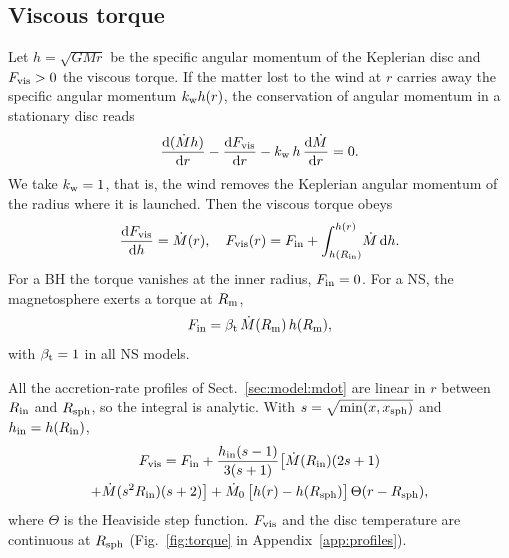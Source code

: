 


\subsection{Viscous torque}
\label{sec:disc:torque}

Let $h = \sqrt{GMr}$ be the specific angular momentum of the Keplerian disc and $F_{\rm vis} > 0$ the viscous torque.
If the matter lost to the wind at $r$ carries away the specific angular momentum $k_{\rm w}h(r)$, the conservation of angular momentum in a stationary disc reads
\begin{equation}
\frac{{\rm d}(\dot M h)}{{\rm d}r} - \frac{{\rm d}F_{\rm vis}}{{\rm d}r} - k_{\rm w}\,h\,\frac{{\rm d}\dot M}{{\rm d}r} = 0 .
\label{eq:angmom}
\end{equation}
We take $k_{\rm w} = 1$, that is, the wind removes the Keplerian angular momentum of the radius where it is launched.
Then the viscous torque obeys
\begin{equation}
\frac{{\rm d}F_{\rm vis}}{{\rm d}h} = \dot M(r), \quad F_{\rm vis}(r) = F_{\rm in} + \int_{h(R_{\rm in})}^{h(r)} \!\dot M\,{\rm d}h .
\label{eq:Fvis}
\end{equation}
For a BH the torque vanishes at the inner radius, $F_{\rm in} = 0$.
For a NS, the magnetosphere exerts a torque at $R_{\rm m}$,
\begin{equation}
F_{\rm in} = \beta_{\rm t}\,\dot M(R_{\rm m})\,h(R_{\rm m}),
\label{eq:Fin_NS}
\end{equation}
with $\beta_{\rm t} = 1$ in all NS models.

All the accretion-rate profiles of Sect.~\ref{sec:model:mdot} are linear in $r$ between $R_{\rm in}$ and $R_{\rm sph}$, so the integral is analytic.
With $s = \sqrt{\min(x, x_{\rm sph})}$ and $h_{\rm in} = h(R_{\rm in})$,
\begin{multline}
F_{\rm vis} = F_{\rm in} + \frac{h_{\rm in}(s - 1)}{3(s + 1)}\bigl[\dot M(R_{\rm in})(2s + 1) \\
+ \dot M(s^2R_{\rm in})(s + 2)\bigr]
+ \dot M_0\,\bigl[h(r) - h(R_{\rm sph})\bigr]\,\Theta(r - R_{\rm sph}),
\label{eq:Fvis_lin}
\end{multline}
where $\Theta$ is the Heaviside step function.
$F_{\rm vis}$ and the disc temperature are continuous at $R_{\rm sph}$ (Fig.~\ref{fig:torque} in Appendix~\ref{app:profiles}).

